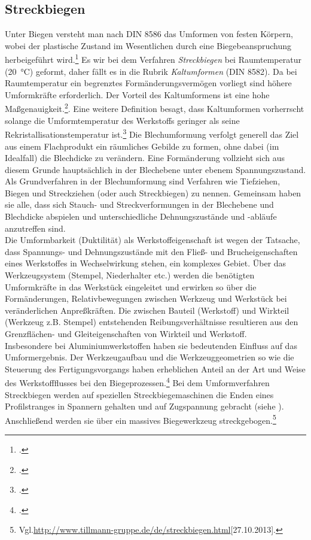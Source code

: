 \documentclass[12pt,a4paper,parskip]{scrartcl}
\begin{document}
	 	 	 	 

\subsection{Streckbiegen}
Unter Biegen versteht man nach DIN 8586 das Umformen von festen Körpern, wobei der plastische Zustand im Wesentlichen durch eine Biegebeanspruchung herbeigeführt wird.\footcite[Vgl.][376]{hu} Es wir bei dem Verfahren \emph{Streckbiegen} bei Raumtemperatur (\SI{20}{\degreeCelsius})  geformt, daher fällt es in die Rubrik \emph{Kaltumformen} (DIN 8582). Da bei Raumtemperatur ein begrenztes Formänderungsvermögen vorliegt sind höhere Umformkräfte erforderlich. Der Vorteil des Kaltumformens ist eine hohe Maßgenauigkeit.\footcite[Vgl.][8]{hu}. Eine weitere Definition besagt, dass Kaltumformen vorherrscht solange die Umformtemperatur des Werkstoffs geringer als seine Rekristallisationstemperatur ist.\footcite[Vgl.][187]{fu} Die Blechumformung verfolgt generell das Ziel aus einem Flachprodukt ein räumliches Gebilde zu formen, ohne dabei (im Idealfall) die Blechdicke zu verändern.  Eine Formänderung vollzieht sich aus diesem Grunde hauptsächlich in der Blechebene unter ebenem Spannungszustand. Als Grundverfahren in der Blechumformung sind Verfahren wie Tiefziehen, Biegen und Streckziehen (oder auch Streckbiegen) zu nennen. Gemeinsam haben sie alle, dass sich Stauch- und Streckverformungen in der Blechebene und Blechdicke abspielen und unterschiedliche Dehnungszustände und -abläufe anzutreffen sind.\\ Die Umformbarkeit (Duktilität) als Werkstoffeigenschaft ist wegen der Tatsache, dass  Spannungs- und Dehnungszustände mit den Fließ- und Brucheigenschaften eines Werkstoffes in Wechselwirkung stehen, ein komplexes Gebiet. Über das Werkzeugsystem (Stempel, Niederhalter etc.) werden die benötigten Umformkräfte in das Werkstück eingeleitet und erwirken so über die  Formänderungen, Relativbewegungen zwischen Werkzeug und Werkstück bei veränderlichen Anpreßkräften. Die zwischen Bauteil (Werkstoff) und Wirkteil (Werkzeug z.B. Stempel) entstehenden Reibungsverhältnisse resultieren aus den  Grenzflächen- und Gleiteigenschaften von Wirkteil und Werkstoff.\\ Insbesondere bei Aluminiumwerkstoffen haben sie bedeutenden Einfluss auf das Umformergebnis. Der Werkzeugaufbau und die Werkzeuggeometrien so wie die Steuerung des Fertigungsvorgangs haben erheblichen Anteil an der Art und Weise des Werkstoffflusses bei den Biegeprozessen.\footcite[Vgl.][499]{aa}
Bei dem Umformverfahren Streckbiegen werden auf speziellen Streckbiegemaschinen die Enden eines Profilstranges in Spannern gehalten und auf  Zugspannung gebracht (siehe  ). Anschließend werden sie über ein massives Biegewerkzeug streckgebogen.\footnote{Vgl.\url{http://www.tillmann-gruppe.de/de/streckbiegen.html}[27.10.2013].} 
\end{document}
